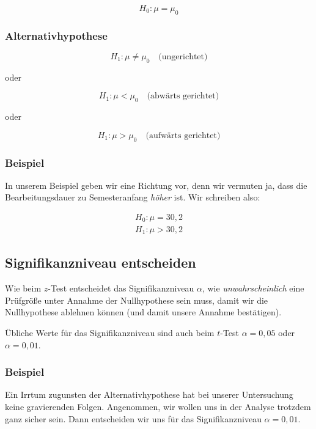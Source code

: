\documentclass[
  11pt,
  ngerman,
  a4paper,
]{report}
\begin{document}
\[
H_0 : \mu = \mu_0
\label{eq:h0}
\]

\hypertarget{alternativhypothese-1}{%
\subsubsection{Alternativhypothese}\label{alternativhypothese-1}}

\[
H_1 : \mu \neq \mu_0 \quad \textrm{(ungerichtet)}
\label{eq:h1u}
\]

oder

\[
H_1 : \mu < \mu_0 \quad \textrm{(abwärts gerichtet)}
\label{eq:h1l}
\]

oder

\[
H_1 : \mu > \mu_0 \quad \textrm{(aufwärts gerichtet)}
\label{eq:h1g}
\]

\hypertarget{beispiel-7}{%
\subsubsection{Beispiel}\label{beispiel-7}}

In unserem Beispiel geben wir eine Richtung vor, denn wir vermuten ja, dass die Bearbeitungsdauer zu Semesteranfang \emph{höher} ist. Wir schreiben also:

\[\begin{aligned}
H_0: \mu = 30{,}2\\
H_1: \mu>30{,}2
\end{aligned}\]

\hypertarget{signifikanzniveau-entscheiden-1}{%
\subsection{Signifikanzniveau entscheiden}\label{signifikanzniveau-entscheiden-1}}

Wie beim \(z\)-Test entscheidet das Signifikanzniveau \(\alpha\), wie \emph{unwahrscheinlich} eine Prüfgröße unter Annahme der Nullhypothese sein muss, damit wir die Nullhypothese ablehnen können (und damit unsere Annahme bestätigen).

Übliche Werte für das Signifikanzniveau sind auch beim \(t\)-Test \(\alpha=0{,}05\) oder \(\alpha=0{,}01\).

\hypertarget{beispiel-8}{%
\subsubsection{Beispiel}\label{beispiel-8}}

Ein Irrtum zugunsten der Alternativhypothese hat bei unserer Untersuchung keine gravierenden Folgen. Angenommen, wir wollen uns in der Analyse trotzdem ganz sicher sein. Dann entscheiden wir uns für das Signifikanzniveau \(\alpha=0{,}01\).
\end{document}
